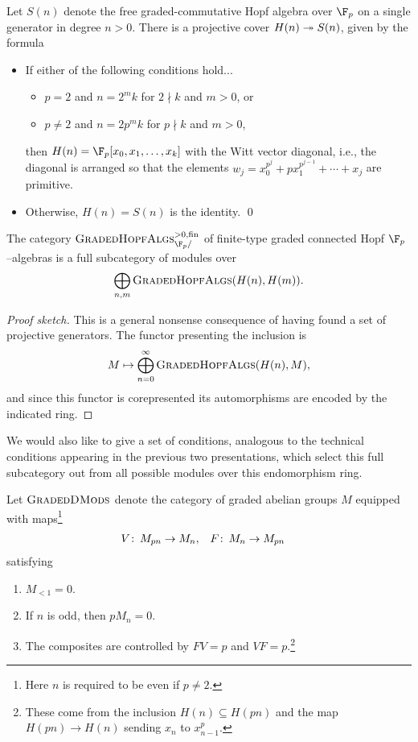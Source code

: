 \begin{theorem}
Let \(S(n)\) denote the free graded-commutative Hopf algebra over \(\F_p\) on a single generator in degree \(n > 0\).  There is a projective cover \(H(n) \twoheadrightarrow S(n)\), given by the formula
\begin{itemize}
\item If either of the following conditions hold...
\begin{itemize}
\item \(p = 2\) and \(n = 2^m k\) for \(2 \nmid k\) and \(m > 0\), or
\item \(p \ne 2\) and \(n = 2p^m k\) for \(p \nmid k\) and \(m > 0\),
\end{itemize}
then \(H(n) = \F_p[x_0, x_1, \ldots, x_k]\) with the Witt vector diagonal, i.e., the diagonal is arranged so that the elements \(w_j = x_0^{p^j} + p x_1^{p^{j-1}} + \cdots + x_j\) are primitive.
\item Otherwise, \(H(n) = S(n)\) is the identity.
\qed
\end{itemize}
\end{theorem}

\begin{corollary}
The category \(\CatOf{GradedHopfAlgs}^{> 0, \fin}_{\F_p/}\) of finite-type graded connected Hopf \(\F_p\)--algebras is a full subcategory of modules over \[\bigoplus_{n, m} \normalfont\textsc{GradedHopfAlgs}(H(n), H(m)).\]
\end{corollary}
\begin{proof}[Proof sketch]
This is a general nonsense consequence of having found a set of projective generators.  The functor presenting the inclusion is \[M \mapsto \bigoplus_{n=0}^\infty \normalfont\textsc{GradedHopfAlgs}(H(n), M),\] and since this functor is corepresented its automorphisms are encoded by the indicated ring.
\end{proof}

We would also like to give a set of conditions, analogous to the technical conditions appearing in the previous two presentations, which select this full subcategory out from all possible modules over this endomorphism ring.

\begin{definition}
Let \(\normalfont\textsc{GradedDMods}\) denote the category of graded abelian groups \(M\) equipped with maps\footnote{Here \(n\) is required to be even if \(p \ne 2\).}
\begin{align*}
V\colon\thinspace M_{pn} & \to M_n, &
F\colon\thinspace M_n & \to M_{pn}
\end{align*}
satisfying
\begin{enumerate}
\item \(M_{< 1} = 0\).
\item If \(n\) is odd, then \(pM_n = 0\).
\item The composites are controlled by \(FV = p\) and \(VF = p\).\footnote{These come from the inclusion \(H(n) \subseteq H(pn)\) and the map \(H(pn) \to H(n)\) sending \(x_n\) to \(x_{n-1}^p\).}
\end{enumerate}
\end{definition}

